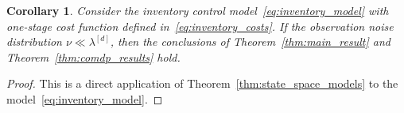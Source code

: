 \documentclass[11pt,onecolumn]{IEEEtran}  %
\newcommand{\Ab}{\mathbb{A}}
\newcommand{\Pb}{\mathbb{P}}
\newcommand{\Rb}{\mathbb{R}}
\newcommand{\Sb}{\mathbb{S}}
\newcommand{\Xb}{\mathbb{X}}
\newcommand{\Yb}{\mathbb{Y}}
\newcommand{\Hc}{\mathcal{H}}
\newcommand{\defeq}{:=}%
\newcommand{\pomdp}{\textsc{pomdp}}
\DeclarePairedDelimiter{\set}{\{}{\}}
\newtheorem{corollary}{Corollary}
\theoremstyle{definition}
\begin{document}
\begin{corollary} \label{cor:inventory_control}
    Consider the inventory control model~\eqref{eq:inventory_model} with one-stage cost function defined in~\eqref{eq:inventory_costs}. If the observation noise distribution $\nu \ll \lambda^{[d]}$, then the conclusions of Theorem~\ref{thm:main_result} and Theorem~\ref{thm:comdp_results} hold.
\end{corollary}

\begin{proof}
    This is a direct application of Theorem~\ref{thm:state_space_models} to the model~\eqref{eq:inventory_model}.
\end{proof}

% 
% 
\end{document}
